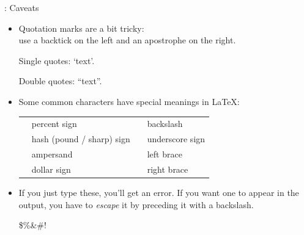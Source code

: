\documentclass{beamer}
\begin{document}
\begin{frame}[fragile]{\insertsubsection{}: Caveats }
\small
\begin{itemize}
\item Quotation marks are a bit tricky:\\
use a backtick \keystroke{\`{}} on the left and an apostrophe \keystroke{\'{}} on the right.
\begin{exampletwouptiny}
Single quotes: `text'.

Double quotes: ``text''.
\end{exampletwouptiny}

\item Some common characters have special meanings in \LaTeX:\\[1ex]
\begin{tabular}{clll}
\keystrokebftt{\%} & percent sign              & \keystrokebftt{\textbackslash} & backslash               \\
\keystrokebftt{\#} & hash (pound / sharp) sign & \keystrokebftt{\_} & underscore sign              \\
\keystrokebftt{\&} & ampersand                 & \keystrokebftt{\{} & left brace              \\
\keystrokebftt{\$} & dollar sign               & \keystrokebftt{\}} & right brace              \\
\end{tabular}
\item If you just type these, you'll get an error. If you want one to appear in
the output, you have to \emph{escape} it by preceding it with a backslash.
\begin{exampletwoup}
\$\%\&\#!
\end{exampletwoup}
\end{itemize}
\end{frame}
\end{document}
